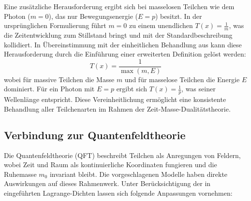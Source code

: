 \documentclass[a4paper,12pt]{article}
\newcommand{\Tfield}{T(x)}
\begin{document}
	Eine zusätzliche Herausforderung ergibt sich bei masselosen Teilchen wie dem Photon (\( m = 0 \)), das nur Bewegungsenergie (\( E = p \)) besitzt. In der ursprünglichen Formulierung führt \( m = 0 \) zu einem unendlichen \(\Tfield = \frac{1}{m}\), was die Zeitentwicklung zum Stillstand bringt und mit der Standardbeschreibung kollidiert. In Übereinstimmung mit der einheitlichen Behandlung aus \cite{wesentlicheFormalismen}\relax kann diese Herausforderung durch die Einführung einer erweiterten Definition gelöst werden:
	\begin{equation}
		\Tfield = \frac{1}{\max(m, E)}
	\end{equation}
	wobei für massive Teilchen die Masse \( m \) und für masselose Teilchen die Energie \( E \) dominiert. Für ein Photon mit \( E = p \) ergibt sich \(\Tfield = \frac{1}{p}\), was seiner Wellenlänge entspricht. Diese Vereinheitlichung ermöglicht eine konsistente Behandlung aller Teilchenarten im Rahmen der Zeit-Masse-Dualitätstheorie.
	
	\subsection{Verbindung zur Quantenfeldtheorie}
	Die Quantenfeldtheorie (QFT) beschreibt Teilchen als Anregungen von Feldern, wobei Zeit und Raum als kontinuierliche Koordinaten fungieren und die Ruhemasse \( m_0 \) invariant bleibt. Die vorgeschlagenen Modelle haben direkte Auswirkungen auf dieses Rahmenwerk. Unter Berücksichtigung der in \cite{wesentlicheFormalismen}\relax eingeführten Lagrange-Dichten lassen sich folgende Anpassungen vornehmen:
	
\end{document}
